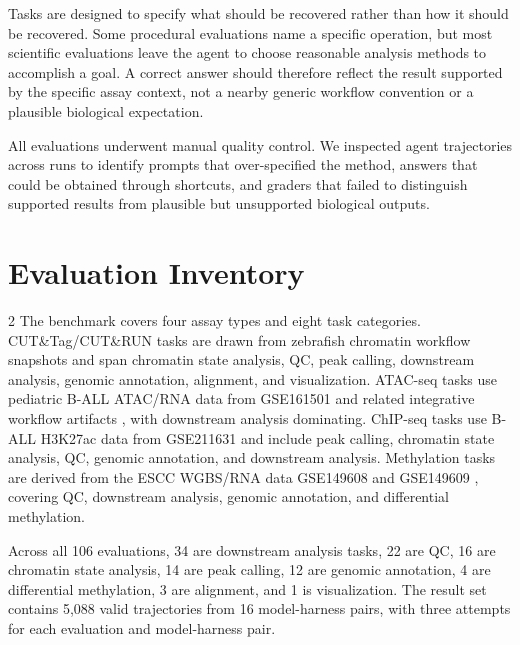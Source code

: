 \documentclass[10pt,letterpaper]{article}
\begin{document}
{\begin{minipage}[t]{0.47\textwidth}
\TwoColParaBreak
Tasks are designed to specify what should be recovered rather than how it
should be recovered. Some procedural evaluations name a specific operation,
but most scientific evaluations leave the agent to choose reasonable analysis
methods to accomplish a goal. A correct answer should therefore reflect the
result supported by the specific assay context, not a nearby generic workflow
convention or a plausible biological expectation.

\TwoColParaBreak
All evaluations underwent manual quality control. We inspected agent
trajectories across runs to identify prompts that over-specified the method,
answers that could be obtained through shortcuts, and graders that failed to
distinguish supported results from plausible but unsupported biological
outputs.
\par

\end{minipage}
}

\clearpage

{\fontsize{9.1}{12.8}\selectfont
\section{Evaluation Inventory}

\begin{multicols}{2}
The benchmark covers four assay types and eight task categories.
CUT\&Tag/CUT\&RUN tasks are drawn from zebrafish chromatin workflow snapshots
and span chromatin state analysis, QC, peak calling, downstream analysis,
genomic annotation, alignment, and visualization. ATAC-seq tasks use pediatric
B-ALL ATAC/RNA data from GSE161501 and related integrative workflow
artifacts \cite{diedrich2021allatac}, with downstream analysis dominating.
ChIP-seq tasks use B-ALL H3K27ac data from GSE211631
\cite{barnett2023ball} and include peak calling, chromatin state analysis, QC,
genomic annotation, and downstream analysis. Methylation tasks are derived
from the ESCC WGBS/RNA data GSE149608 and GSE149609 \cite{cao2020escc},
covering QC, downstream analysis, genomic annotation, and differential
methylation.
\par

{\fontsize{8.3}{11.4}\selectfont
Across all 106 evaluations, 34 are downstream analysis tasks, 22 are QC, 16
are chromatin state analysis, 14 are peak calling, 12 are genomic annotation,
4 are differential methylation, 3 are alignment, and 1 is visualization. The
result set contains 5,088 valid trajectories from 16 model-harness pairs,
with three attempts for each evaluation and model-harness pair.
\par}

\end{multicols}
}
\end{document}
